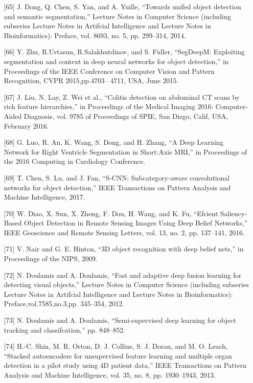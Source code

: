 \documentclass[a4paper]{article}
\begin{document}
[65] J. Dong, Q. Chen, S. Yan, and A. Yuille, “Towards unifed
object detection and semantic segmentation,” Lecture Notes in
Computer Science (including subseries Lecture Notes in Artifcial
Intelligence and Lecture Notes in Bioinformatics): Preface, vol.
8693, no. 5, pp. 299–314, 2014.


[66] Y. Zhu, R.Urtasun, R.Salakhutdinov, and S. Fidler, “SegDeepM:
Exploiting segmentation and context in deep neural networks
for object detection,” in Proceedings of the IEEE Conference on
Computer Vision and Pattern Recognition, CVPR 2015,pp.4703–
4711, USA, June 2015.


[67] J. Liu, N. Lay, Z. Wei et al., “Colitis detection on abdominal CT
scans by rich feature hierarchies,” in Proceedings of the Medical
Imaging 2016: Computer-Aided Diagnosis, vol. 9785 of Proceedings of SPIE, San Diego, Calif, USA, February 2016.


[68] G. Luo, R. An, K. Wang, S. Dong, and H. Zhang, “A Deep Learning Network for Right Ventricle Segmentation in Short:Axis
MRI,” in Proceedings of the 2016 Computing in Cardiology
Conference.


[69] T. Chen, S. Lu, and J. Fan, “S-CNN: Subcategory-aware convolutional networks for object detection,” IEEE Transactions on
Pattern Analysis and Machine Intelligence, 2017.


[70] W. Diao, X. Sun, X. Zheng, F. Dou, H. Wang, and K. Fu,
“Efcient Saliency-Based Object Detection in Remote Sensing
Images Using Deep Belief Networks,” IEEE Geoscience and
Remote Sensing Letters, vol. 13, no. 2, pp. 137–141, 2016.


[71] V. Nair and G. E. Hinton, “3D object recognition with deep
belief nets,” in Proceedings of the NIPS, 2009.


[72] N. Doulamis and A. Doulamis, “Fast and adaptive deep fusion
learning for detecting visual objects,” Lecture Notes in Computer
Science (including subseries Lecture Notes in Artifcial Intelligence
and Lecture Notes in Bioinformatics): Preface,vol.7585,no.3,pp.
345–354, 2012.


[73] N. Doulamis and A. Doulamis, “Semi-supervised deep learning
for object tracking and classifcation,” pp. 848–852.


[74] H.-C. Shin, M. R. Orton, D. J. Collins, S. J. Doran, and M. O.
Leach, “Stacked autoencoders for unsupervised feature learning
and multiple organ detection in a pilot study using 4D patient
data,” IEEE Transactions on Pattern Analysis and Machine
Intelligence, vol. 35, no. 8, pp. 1930–1943, 2013.
\end{document}
